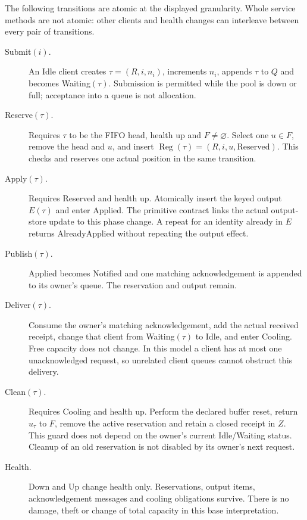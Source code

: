\documentclass[11pt]{article}
\newcommand{\Reg}{\operatorname{Reg}}
\begin{document}
The following transitions are atomic at the displayed granularity. Whole service methods are not atomic: other clients and health changes can interleave between every pair of transitions.

\begin{description}
\item[Submit$(i)$.] An Idle client creates $\tau=(R,i,n_i)$, increments $n_i$, appends $\tau$ to $Q$ and becomes Waiting$(\tau)$. Submission is permitted while the pool is down or full; acceptance into a queue is not allocation.
\item[Reserve$(\tau)$.] Requires $\tau$ to be the FIFO head, health up and $F\neq\varnothing$. Select one $u\in F$, remove the head and $u$, and insert $\Reg(\tau)=(R,i,u,\mathrm{Reserved})$. This checks and reserves one actual position in the same transition.
\item[Apply$(\tau)$.] Requires Reserved and health up. Atomically insert the keyed output $E(\tau)$ and enter Applied. The primitive contract links the actual output-store update to this phase change. A repeat for an identity already in $E$ returns AlreadyApplied without repeating the output effect.
\item[Publish$(\tau)$.] Applied becomes Notified and one matching acknowledgement is appended to its owner's queue. The reservation and output remain.
\item[Deliver$(\tau)$.] Consume the owner's matching acknowledgement, add the actual received receipt, change that client from Waiting$(\tau)$ to Idle, and enter Cooling. Free capacity does not change. In this model a client has at most one unacknowledged request, so unrelated client queues cannot obstruct this delivery.
\item[Clean$(\tau)$.] Requires Cooling and health up. Perform the declared buffer reset, return $u_\tau$ to $F$, remove the active reservation and retain a closed receipt in $Z$. This guard does not depend on the owner's current Idle/Waiting status. Cleanup of an old reservation is not disabled by its owner's next request.
\item[Health.] Down and Up change health only. Reservations, output items, acknowledgement messages and cooling obligations survive. There is no damage, theft or change of total capacity in this base interpretation.
\end{description}
\end{document}
